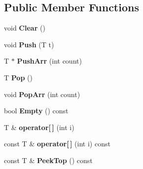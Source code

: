 \subsection*{Public Member Functions}
\begin{DoxyCompactItemize}
\item 
\hypertarget{classtinyxml2_1_1_dyn_array_af87a804cd831226d069274b44b74b8bc}{}void {\bfseries Clear} ()\label{classtinyxml2_1_1_dyn_array_af87a804cd831226d069274b44b74b8bc}

\item 
\hypertarget{classtinyxml2_1_1_dyn_array_aea7ffe983b5d3284bd43171afd7c99d0}{}void {\bfseries Push} (T t)\label{classtinyxml2_1_1_dyn_array_aea7ffe983b5d3284bd43171afd7c99d0}

\item 
\hypertarget{classtinyxml2_1_1_dyn_array_ad289abee8cd02b26e215f1b63d2043f1}{}T $\ast$ {\bfseries Push\+Arr} (int count)\label{classtinyxml2_1_1_dyn_array_ad289abee8cd02b26e215f1b63d2043f1}

\item 
\hypertarget{classtinyxml2_1_1_dyn_array_a27a3f2f6f869815b6eabb3ea40cf0712}{}T {\bfseries Pop} ()\label{classtinyxml2_1_1_dyn_array_a27a3f2f6f869815b6eabb3ea40cf0712}

\item 
\hypertarget{classtinyxml2_1_1_dyn_array_ab8b8c94a2312ab27e2846f0d61ef677a}{}void {\bfseries Pop\+Arr} (int count)\label{classtinyxml2_1_1_dyn_array_ab8b8c94a2312ab27e2846f0d61ef677a}

\item 
\hypertarget{classtinyxml2_1_1_dyn_array_a1c6766bdf61c2d3c2b95dab146ab48b9}{}bool {\bfseries Empty} () const \label{classtinyxml2_1_1_dyn_array_a1c6766bdf61c2d3c2b95dab146ab48b9}

\item 
\hypertarget{classtinyxml2_1_1_dyn_array_a756cf4e7464c711aa720e2b17a251daa}{}T \& {\bfseries operator\mbox{[}$\,$\mbox{]}} (int i)\label{classtinyxml2_1_1_dyn_array_a756cf4e7464c711aa720e2b17a251daa}

\item 
\hypertarget{classtinyxml2_1_1_dyn_array_ac97d6ddabbcdb098f155e7fc11ea5d91}{}const T \& {\bfseries operator\mbox{[}$\,$\mbox{]}} (int i) const \label{classtinyxml2_1_1_dyn_array_ac97d6ddabbcdb098f155e7fc11ea5d91}

\item 
\hypertarget{classtinyxml2_1_1_dyn_array_a5658d49c056707f14b089b53c358eb11}{}const T \& {\bfseries Peek\+Top} () const \label{classtinyxml2_1_1_dyn_array_a5658d49c056707f14b089b53c358eb11}


\end{DoxyCompactItemize}
